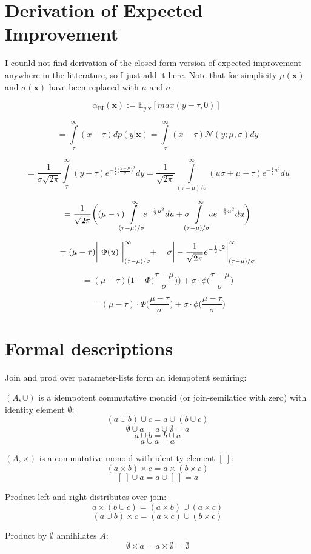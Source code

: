 \documentclass[english]{article}
\newcommand{\EI}{\operatorname{EI}}
\newcommand{\x}{\mathbf{x}}
\begin{document}
\section{Derivation of Expected Improvement}
\label{EI derivation}
I counld not find derivation of the closed-form version of expected improvement anywhere in the litterature, so I just add it here. Note that for simplicity $\mu(\x)$ and $\sigma(\x)$ have been replaced with $\mu$ and $\sigma$.

$$\alpha_{\EI}(\x) := \mathbb{E}_{y|\x}[max(y-\tau, 0)]\ $$

$$= \int\limits_{\tau}^{\infty}(x-\tau)dp(y|\x) = \int\limits_{\tau}^{\infty}(x-\tau)\mathcal{N}(y;\mu,\sigma)dy$$

$$ = \frac{1}{\sigma\sqrt{2\pi}} \int\limits_{\tau}^{\infty}(y-\tau)e^{-\frac{1}{2}\big(\frac{y-\mu}{\sigma}\big)^2}dy =
\frac{1}{\sqrt{2\pi}} \int\limits_{(\tau-\mu)/\sigma}^{\infty}(u\sigma+\mu-\tau)e^{-\frac{1}{2}u^2}du$$

$$=\frac{1}{\sqrt{2\pi}}\bigg((\mu-\tau) \mkern-12mu \int\limits_{(\tau-\mu)/\sigma}^{\infty} \mkern-10mu e^{-\frac{1}{2}u^2}du + \sigma \mkern-12mu \int\limits_{(\tau-\mu)/\sigma}^{\infty} \mkern-10mu u e^{-\frac{1}{2}u^2}du \bigg)$$

$$=(\mu-\tau)\bigg|\ \Phi(u)\ \bigg|_{(\tau-\mu)/\sigma}^{\infty} \mkern-6mu + \ \ \ \sigma\bigg|-\frac{1}{\sqrt{2\pi}}e^{-\frac{1}{2}u^2}\bigg|_{(\tau-\mu)/\sigma}^{\infty}$$

$$=(\mu-\tau)\bigg(1-\Phi\bigg(\frac{\tau-\mu}{\sigma}\bigg)\bigg) + \sigma \cdot \phi \bigg(\frac{\tau-\mu}{\sigma}\bigg)$$

$$ = (\mu - \tau) \cdot \Phi \bigg(\frac{\mu-\tau}{\sigma}\bigg) + \sigma \cdot \phi \bigg(\frac{\mu-\tau}{\sigma}\bigg)$$


\section{Formal descriptions}
Join and prod over parameter-lists form an idempotent semiring:

$(A, \cup)$ is a idempotent commutative monoid (or join-semilatice with zero) with identity element $\emptyset$:
$$(a \cup b) \cup c = a \cup (b \cup c)$$
$$\emptyset \cup a = a \cup \emptyset = a$$
$$a \cup b = b \cup a$$
$$a \cup a = a$$

$(A, \times)$ is a commutative monoid with identity element $[\ ]$:
$$(a \times b) \times c = a \times (b \times c)$$
$$[\ ] \cup a = a \cup [\ ] = a$$

Product left and right distributes over join:
$$a\times(b \cup c) = (a\times b) \cup (a\times c)$$
$$(a \cup b)\times c = (a\times c) \cup (b\times c)$$

Product by $\emptyset$ annihilates $A$:
$$\emptyset \times a = a \times \emptyset = \emptyset$$


\printbibliography


 
\end{document}
